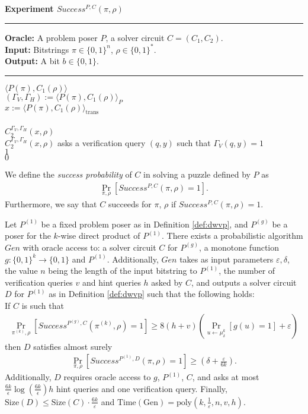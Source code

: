 %
\begin{codeblock}
  \textbf{Experiment $Success^{P, C}(\pi, \rho) $}
  \medskip
  \hrule
  \medskip
  \textbf{Oracle:} A problem poser $P$, a solver circuit $C = (C_1, C_2)$.\\
  \textbf{Input:}  Bitstrings $\pi \in \{0,1\}^n$, $\rho \in \{0,1\}^*$.\\
  \textbf{Output:} A bit $b \in \{0,1\}$.
  \medskip\hrule\medskip
  \Run $\langle P(\pi), C_1(\rho) \rangle$ \\
  \IndI $(\Gamma_V, \Gamma_H) := \langle P(\pi), C_1(\rho) \rangle_{P}$ \\
  \IndI $x := \langle P(\pi), C_1(\rho) \rangle_{\text{trans}}$ \\ \\
  \Run $C_2^{\Gamma_V,\Gamma_H}(x, \rho)$ \\
  \IndI \If $C_2^{\Gamma_V, \Gamma_H}(x, \rho)$ asks a verification query $(q, y)$ such that $\Gamma_V(q, y) = 1$ \then \\
  \IndII \return $1$ \\
  \return $0$ \\
\end{codeblock}
%
We define the \textit{success probability} of $C$ in solving a puzzle defined by $P$ as
\begin{align}
 \underset{\pi, \rho}{\Pr}[Success^{P,C}(\pi, \rho) = 1].
\end{align}
Furthermore, we say that $C$ succeeds for $\pi$, $\rho$ if $Success^{P,C}(\pi, \rho) = 1$.
%
\begin{theorem}
\label{th:sec_amp_for_dwvp}
Let $P^{(1)}$ be a fixed problem poser as in Definition \ref{def:dwvp}, and $P^{(g)}$ be a poser for the $k$-wise direct product of $P^{(1)}$.
There exists a probabilistic algorithm $Gen$ with oracle access to: a solver circuit $C$ for $P^{(g)}$,
a monotone function $g:\{0,1\}^k \rightarrow \{0,1\}$ and $P^{(1)}$. Additionally, $Gen$ takes as input parameters $\varepsilon, \delta$,
the value $n$ being the length of the input bitstring to $P^{(1)}$,
the number of verification queries $v$ and hint queries $h$ asked by $C$, and outputs a solver circuit $D$ for $P^{(1)}$ as in Definition \ref{def:dwvp}
such that the following holds: \\
If $C$ is such that
  \begin{align*}
    \underset{\pi^{(k)}, \rho}{\Pr}\left[Success^{P^{(g)}, C}(\pi^{(k)}, \rho) = 1\right]
    \geq 8(h+v)\left(\underset{u \leftarrow \mu_\delta^k}{\Pr}\left[g(u) = 1\right] + \varepsilon\right)
  \end{align*}
then $D$ satisfies almost surely
  \begin{align*}
    \underset{\pi, \rho}{\Pr}\left[Success^{P^{(1)},D}(\pi, \rho) = 1\right] \geq (\delta + \frac{\varepsilon}{6k}).
  \end{align*}
Additionally, $D$ requires oracle access to $g$, $P^{(1)}$, $C$,
and asks at most $\frac{6k}{\epsilon}\log\left(\frac{6k}{\epsilon}\right) h$ hint queries and one verification query.
Finally, $\text{Size}(D) \leq \text{Size}(C) \cdot \frac{6k}{\varepsilon}$ and $\text{Time}(\text{Gen}) = \text{poly}(k, \frac{1}{\varepsilon}, n, v, h)$.
\end{theorem}
